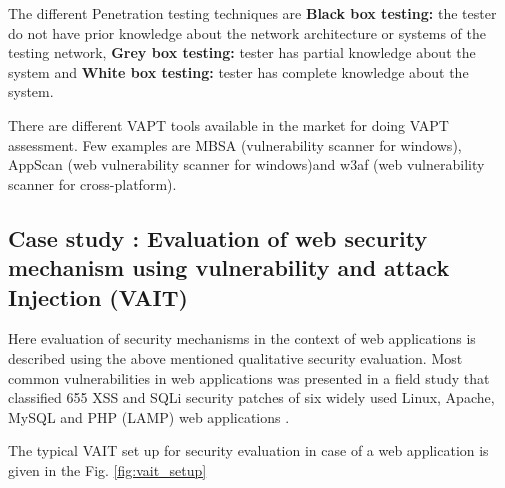 \documentclass[pdftex,english,oribibl]{llncs}
\begin{document}
The different Penetration testing techniques are \textbf{Black box testing:} the tester do not have prior knowledge about the network architecture or systems of the testing network, \textbf{Grey box testing:} tester has partial knowledge about the system and \textbf{White box testing:} tester has complete knowledge about the system.

There are different VAPT tools available in the market for doing VAPT assessment. Few examples are MBSA (vulnerability scanner for windows), AppScan (web vulnerability scanner for windows)and w3af (web vulnerability scanner for cross-platform).

\subsection{Case study : Evaluation of web security mechanism using vulnerability and attack Injection (VAIT)}
Here evaluation of security mechanisms in the context of web applications is described using the above mentioned qualitative security evaluation. Most common vulnerabilities in web applications was presented in a field study that classified 655 XSS and SQLi security patches of six widely used Linux, Apache, MySQL and PHP (LAMP) web applications \cite{6629992_Fronseca}. 

The typical VAIT set up for security evaluation in case of a web application is given in the Fig. \ref{fig:vait_setup}
\end{document}
